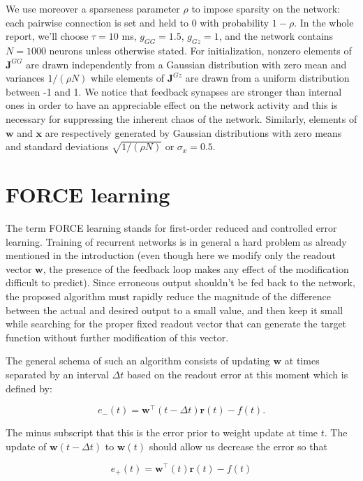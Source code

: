 We use moreover a sparseness parameter $\rho$ to impose sparsity on the 
network: each pairwise connection is set and held to 0 with probability 
$1 - \rho$. In the whole report, we'll choose $\tau=10$ ms, $g_{GG} = 1.5$,
$g_{Gz} = 1$, and the network contains $N=1000$ neurons unless otherwise 
stated. For initialization, nonzero elements of $\mathbf{J}^{GG}$ are drawn
independently from a Gaussian distribution with zero mean and variances
$1/(\rho N)$ while elements of $\mathbf{J}^{Gz}$ are drawn from a uniform
distribution between -1 and 1. We notice that feedback synapses are stronger
than internal ones in order to have an appreciable effect on the
network activity and this is necessary for suppressing the inherent
chaos of the network. Similarly, elements of $\mathbf{w}$ and 
$\mathbf{x}$ are respectively generated by Gaussian distributions with zero 
means and standard deviations $\sqrt{1/(\rho N)}$ or $\sigma_x = 0.5$.

\section{FORCE learning}

The term FORCE learning stands for first-order reduced and controlled error
learning. Training of recurrent networks is in general a hard problem as 
already mentioned in the introduction (even though here we modify only
the readout vector $\mathbf{w}$, the presence of the feedback loop makes
any effect of the modification difficult to predict). Since erroneous output
shouldn't be fed back to the network, the proposed algorithm must rapidly 
reduce the magnitude of the difference between the actual and desired output
to a small value, and then keep it small while searching for the proper
fixed readout vector that can generate the target function without further
modification of this vector.

The general schema of such an algorithm consists of updating $\mathbf{w}$
at times separated by an interval $\Delta t$ based on the readout error
at this moment which is defined by:

\[e_-(t) = \mathbf{w}^{\top}(t-\Delta t)\mathbf{r}(t) - f(t).\]

\noindent
The minus subscript that this is the error prior to weight update at time
$t$. The update of $\mathbf{w}(t-\Delta t)$ to $\mathbf{w}(t)$ should
allow us decrease the error so that

\[e_+(t) = \mathbf{w}^{\top}(t)\mathbf{r}(t) - f(t)\]


